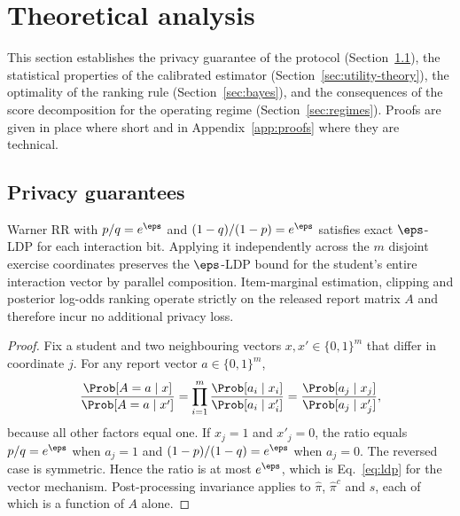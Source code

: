
\section{Theoretical analysis}\label{sec:theory}

This section establishes the privacy guarantee of the protocol (Section~\ref{sec:privacy-theory}), the statistical properties of the calibrated estimator (Section~\ref{sec:utility-theory}), the optimality of the ranking rule (Section~\ref{sec:bayes}), and the consequences of the score decomposition for the operating regime (Section~\ref{sec:regimes}). Proofs are given in place where short and in Appendix~\ref{app:proofs} where they are technical.

\subsection{Privacy guarantees}\label{sec:privacy-theory}

\begin{theorem}\label{thm:privacy}
Warner RR with $p/q=e^{\eps}$ and $(1-q)/(1-p)=e^{\eps}$ satisfies exact $\eps$-LDP for each interaction bit. Applying it independently across the $m$ disjoint exercise coordinates preserves the $\eps$-LDP bound for the student's entire interaction vector by parallel composition. Item-marginal estimation, clipping and posterior log-odds ranking operate strictly on the released report matrix $A$ and therefore incur no additional privacy loss.
\end{theorem}

\begin{proof}
Fix a student and two neighbouring vectors $x,x'\in\{0,1\}^{m}$ that differ in coordinate $j$. For any report vector $a\in\{0,1\}^{m}$,
\begin{equation}\label{eq:proof-ratio}
\frac{\Prob[A=a\mid x]}{\Prob[A=a\mid x']}
=\prod_{i=1}^{m}\frac{\Prob[a_i\mid x_i]}{\Prob[a_i\mid x'_i]}
=\frac{\Prob[a_j\mid x_j]}{\Prob[a_j\mid x'_j]},
\end{equation}
because all other factors equal one. If $x_j=1$ and $x'_j=0$, the ratio equals $p/q=e^{\eps}$ when $a_j=1$ and $(1-p)/(1-q)=e^{\eps}$ when $a_j=0$. The reversed case is symmetric. Hence the ratio is at most $e^{\eps}$, which is Eq.~\eqref{eq:ldp} for the vector mechanism. Post-processing invariance \cite{dwork2014algorithmic} applies to $\hat\pi$, $\hat\pi^{c}$ and $s$, each of which is a function of $A$ alone.
\end{proof}

